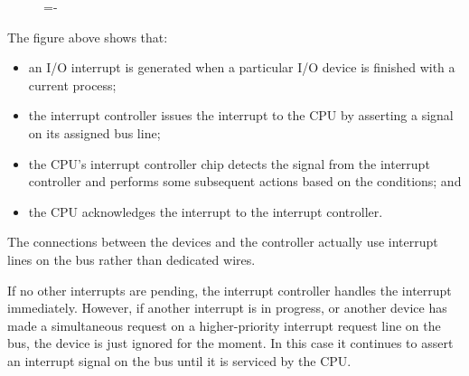 \documentclass[a4paper]{systems-software}
\begin{document}
\begin{figure}[H]
  \lineskip=-\fboxrule
\end{figure}

The figure above shows that:
\begin{itemize}
	\item an I/O interrupt is generated when a particular I/O device is finished with a current process;
	\item the interrupt controller issues the interrupt to the CPU by asserting a signal on its assigned bus line;
	\item the CPU's interrupt controller chip detects the signal from the interrupt controller and performs some subsequent actions based on the conditions; and
	\item the CPU acknowledges the interrupt to the interrupt controller.
\end{itemize}

The connections between the devices and the controller actually use interrupt lines on the bus rather than dedicated wires.

If no other interrupts are pending, the interrupt controller handles the interrupt immediately. However, if another interrupt is in progress, or another device has made a simultaneous request on a higher-priority interrupt request line on the bus, the device is just ignored for the moment. In this case it continues to assert an interrupt signal on the bus until it is serviced by the CPU.
\end{document}
